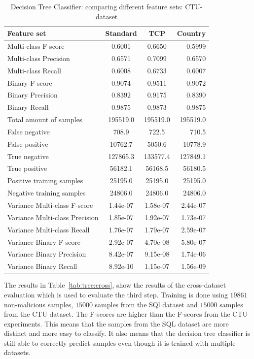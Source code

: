 \begin{table}[H]
\caption{Decision Tree Classifier: comparing different feature sets: CTU-dataset}
\label{tab:tree:ctu}
\centering
\begin{tabular}{l c c r}
\toprule
Feature set & Standard & TCP & Country \\
\midrule
Multi-class F-score & 0.6001 & 0.6650 & 0.5999 \\
Multi-class Precision & 0.6571 & 0.7099 & 0.6570 \\
Multi-class Recall & 0.6008 & 0.6733 & 0.6007 \\
\midrule
Binary F-score & 0.9074 & 0.9511 & 0.9072 \\
Binary Precision & 0.8392 & 0.9175 & 0.8390 \\
Binary Recall & 0.9875 & 0.9873 & 0.9875 \\
\midrule
Total amount of samples & 195519.0 & 195519.0 & 195519.0 \\
False negative & 708.9  &  722.5 & 710.5 \\
False positive & 10762.7 & 5050.6 & 10778.9 \\
True negative & 127865.3 & 133577.4 & 127849.1  \\
True positive & 56182.1 & 56168.5  & 56180.5 \\
\midrule
Positive training samples & 25195.0 & 25195.0 & 25195.0\\
Negative training samples & 24806.0 & 24806.0 & 24806.0\\
\midrule
Variance Multi-class F-score & 1.44e-07 & 1.58e-07 & 2.44e-07 \\
Variance Multi-class Precision & 1.85e-07  &  1.92e-07 &  1.73e-07 \\
Variance Multi-class Recall &  1.76e-07 & 1.79e-07 &  2.59e-07  \\
\midrule
Variance Binary F-score & 2.92e-07  & 4.70e-08 & 5.80e-07  \\
Variance Binary Precision & 8.42e-07  &  9.15e-08  & 1.74e-06   \\
Variance Binary Recall & 8.92e-10 &  1.15e-07 & 1.56e-09 \\
\bottomrule
\end{tabular}
\end{table}

\noindent The results in Table~\ref{tab:tree:cross}, show the results of the cross-dataset evaluation which is used to evaluate the third step. Training is done using $19861$ non-malicious samples, $15000$ samples from the SQl dataset and $15000$ samples from the CTU dataset. The F-scores are higher than the F-scores from the CTU experiments. This means that the samples from the SQL dataset are more distinct and more easy to classify. It also means that the decision tree classifier is still able to correctly predict samples even though it is trained with multiple datasets. 

